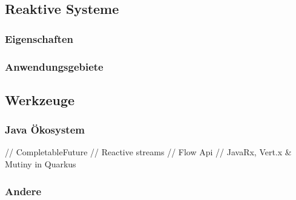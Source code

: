 \subsection{Reaktive Systeme}
\label{section:reaktive_systeme}

\subsubsection{Eigenschaften}

\subsubsection{Anwendungsgebiete}

\subsection{Werkzeuge}
\subsubsection{Java Ökosystem}
// CompletableFuture
// Reactive streams
// Flow Api
// JavaRx, Vert.x \& Mutiny in Quarkus
\subsubsection{Andere}